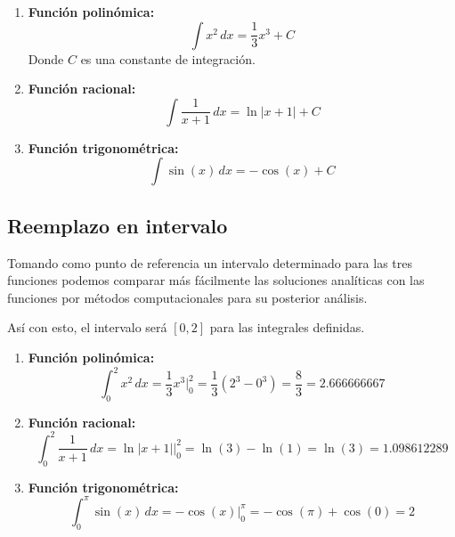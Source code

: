 \documentclass[a4paper]{article}
\begin{document}
    \begin{enumerate}
      \item \textbf{Función polinómica:}
      \begin{equation}
      \int x^2 \, dx = \frac{1}{3}x^3 + C
      \end{equation}
      Donde \(C\) es una constante de integración.

      \item \textbf{Función racional:}
      \begin{equation}
      \int \frac{1}{x + 1} \,dx = \ln|x + 1| + C 
      \end{equation}
    
      \item \textbf{Función trigonométrica:}
      \begin{equation}
      \int \sin(x) \, dx = -\cos(x) + C
      \end{equation}
    \end{enumerate}

    \subsection{Reemplazo en intervalo}

    Tomando como punto de referencia un intervalo determinado para las tres funciones podemos
    comparar más fácilmente las soluciones analíticas con las funciones por métodos computacionales para 
    su posterior análisis.

    Así con esto, el intervalo será \( [0, 2] \) para las integrales definidas.

    \begin{enumerate}
        \item \textbf{Función polinómica:}
        \begin{equation}
        \int_{0}^{2} x^2 \, dx = \frac{1}{3}x^3 \Big|_{0}^{2} = \frac{1}{3}(2^3 - 0^3) = \frac{8}{3} = 2.666666667
        \end{equation}
    
        \item \textbf{Función racional:}
        \begin{equation}
        \int_{0}^{2} \frac{1}{x + 1} \,dx = \ln|x + 1| \Big|_{0}^{2} = \ln(3) - \ln(1) = \ln(3) = 1.098612289
        \end{equation}
    
        \item \textbf{Función trigonométrica:}
        \begin{equation}
        \int_{0}^{\pi} \sin(x) \, dx = -\cos(x) \Big|_{0}^{\pi} = -\cos(\pi) + \cos(0) = 2
        \end{equation}
    \end{enumerate}
    
\end{document}

